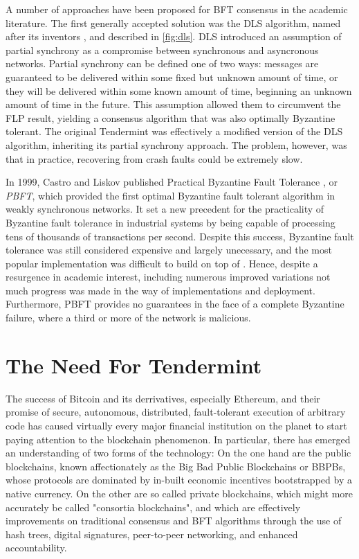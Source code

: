 A number of approaches have been proposed for BFT consensus in the academic literature.
The first generally accepted solution was the DLS algorithm, named after its inventors \cite{dls}, and described in \ref{fig:dls}.
DLS introduced an assumption of partial synchrony as a compromise between synchronous and asyncronous networks.
Partial synchrony can be defined one of two ways: 
messages are guaranteed to be delivered within some fixed but unknown amount of time,
or they will be delivered within some known amount of time, beginning an unknown amount of time in the future.
This assumption allowed them to circumvent the FLP result, yielding a consensus algorithm that was also optimally Byzantine tolerant.
The original Tendermint was effectively a modified version of the DLS algorithm, inheriting its partial synchrony approach.
The problem, however, was that in practice, recovering from crash faults could be extremely slow.

In 1999, Castro and Liskov published Practical Byzantine Fault Tolerance \cite{pbft}, or \emph{PBFT}, 
which provided the first optimal Byzantine fault tolerant algorithm in weakly synchronous networks.
It set a new precedent for the practicality of Byzantine fault tolerance in industrial systems by being capable 
of processing tens of thousands of transactions per second.
Despite this success, Byzantine fault tolerance was still considered expensive and largely unecessary, 
and the most popular implementation was difficult to build on top of \cite{ppbft}.
Hence, despite a resurgence in academic interest, including numerous improved variations \cite{yin2003separating, kotla2007zyzzyva}
not much progress was made in the way of implementations and deployment.
Furthermore, PBFT provides no guarantees in the face of a complete Byzantine failure, where a third or more of the network is malicious.

\section{The Need For Tendermint}

The success of Bitcoin and its derrivatives, especially Ethereum, and their promise of secure, autonomous, distributed, fault-tolerant execution of arbitrary code has caused virtually every major financial institution on the planet to start paying attention to the blockchain phenomenon. 
In particular, there has emerged an understanding of two forms of the technology:
On the one hand are the public blockchains, known affectionately as the Big Bad Public Blockchains or BBPBs, 
whose protocols are dominated by in-built economic incentives bootstrapped by a native currency.
On the other are so called private blockchains, which might more accurately be called "consortia blockchains",
and which are effectively improvements on traditional consensus and BFT algorithms through the use of hash trees, digital signatures, 
peer-to-peer networking, and enhanced accountability.

